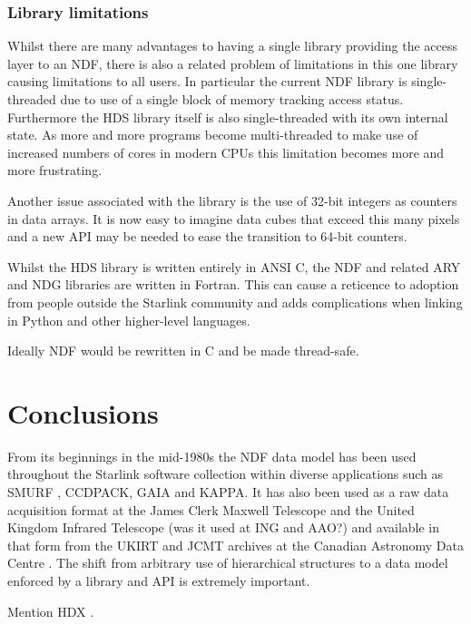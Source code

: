 \documentclass[final,authoryear,5p,times,twocolumn]{elsarticle}
\begin{document}
{\subsubsection{Library limitations}

Whilst there are many advantages to having a single library
providing the access layer to an NDF, there is also a related problem
of limitations in this one library causing limitations to all
users. In particular the current NDF library is single-threaded due to
use of a single block of memory tracking access status. Furthermore
the HDS library itself is also single-threaded with its own internal
state. As more and more programs become multi-threaded to make use of
increased numbers of cores in modern CPUs this limitation becomes more
and more frustrating.

Another issue associated with the library is the use of 32-bit
integers as counters in data arrays. It is now easy to imagine data
cubes that exceed this many pixels and a new API may be needed to ease
the transition to 64-bit counters.

Whilst the HDS library is written entirely in ANSI C, the NDF and
related ARY \citep{SUN11} and NDG \citep{SUN2} libraries are written in Fortran.
This can cause a reticence to adoption from people outside the Starlink community and
adds complications when linking in Python and other higher-level
languages.

Ideally NDF would be rewritten in C and be made thread-safe.

\section{Conclusions}

From its beginnings in the mid-1980s the NDF data model has been used
throughout the Starlink software collection within diverse
applications such as SMURF \citep{2013MNRAS.430.2545C}, CCDPACK, GAIA
and KAPPA. It has also been used as a raw data acquisition format at the
James Clerk Maxwell Telescope and the United Kingdom Infrared
Telescope {\color{red} (was it used at ING and AAO?)} and available in that form
from the UKIRT and JCMT archives at the Canadian Astronomy Data Centre
\citep{2008ASPC..394..450E,P01_adassxxiii}. The shift from arbitrary
use of hierarchical structures to a data model enforced by a library
and API is extremely important.

{\color{red} Mention HDX \citep{2003ASPC..295..221G}.}

}
\end{document}
